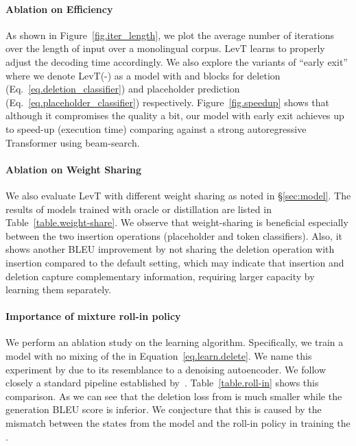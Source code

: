 \documentclass{article}
\newcommand{\secref}[1]{\S\ref{#1}}
\begin{document}
\paragraph{Ablation on Efficiency}
As shown in Figure~\ref{fig.iter_length}, we plot the average number of iterations over the length of input over a monolingual corpus. LevT learns to properly adjust the decoding time accordingly. We also explore the variants of ``early exit'' where we denote LevT(-) as a model with  and  blocks for deletion (Eq.~\eqref{eq.deletion_classifier}) and placeholder prediction (Eq.~\eqref{eq.placeholder_classifier}) respectively. Figure~\ref{fig.speedup} shows that although it compromises the quality a bit, our model with early exit achieves up to  speed-up (execution time) comparing against a strong autoregressive Transformer using beam-search.

\paragraph{Ablation on Weight Sharing}
We also evaluate LevT with different weight sharing as noted in \secref{sec:model}. The results of models trained with oracle or distillation are listed in Table~\ref{table.weight-share}.
We observe that weight-sharing is beneficial especially between the two insertion operations (placeholder and token classifiers). Also, it shows another  BLEU improvement by not sharing the deletion operation with insertion compared to the default setting, which may indicate that insertion and deletion capture complementary information, requiring larger capacity by learning them separately.

\paragraph{Importance of mixture roll-in policy} 
We perform an ablation study on the learning algorithm. Specifically, we train a model with no mixing of the  in Equation~\eqref{eq.learn.delete}. We name this experiment by  due to its resemblance to a denoising autoencoder.
We follow closely a standard pipeline established by~\citet{lee2018deterministic}.
Table~\ref{table.roll-in} shows this comparison. As we can see that the deletion loss from  is much smaller while the generation BLEU score is inferior.
We conjecture that this is caused by the mismatch between the states from the model and the roll-in policy in training the .
\end{document}

